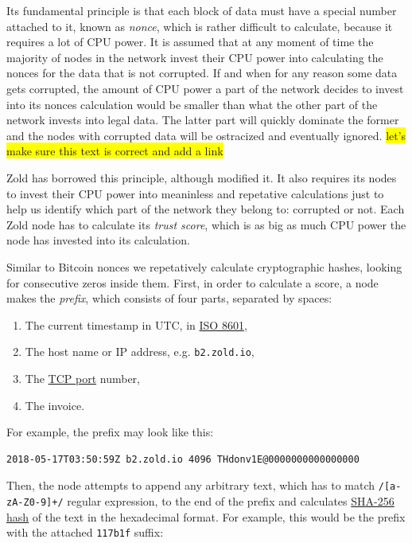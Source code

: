 \documentclass[11pt,oneside]{article}
\newcommand\dd[1]{\colorbox{gray!30}{\texttt{#1}}}
\begin{document}
Its fundamental principle is that each block of data must have a special
number attached to it, known as \emph{nonce}, which is rather difficult to calculate,
because it requires a lot of CPU power. It is assumed that at any moment
of time the majority of nodes in the network invest their CPU power into
calculating the nonces for the data that is not corrupted. If and when for any reason
some data gets corrupted, the amount of CPU power a part of the network
decides to invest into its nonces calculation would be smaller than what
the other part of the network invests into legal data. The latter part
will quickly dominate the former and the nodes with corrupted data will
be ostracized and eventually ignored.
\colorbox{yellow}{let's make sure this text is correct and add a link}

Zold has borrowed this principle, although modified it. It also requires
its nodes to invest their CPU power into meaninless and repetative
calculations just to help us identify which part of the network they belong to:
corrupted or not. Each Zold node has to calculate its \emph{trust score},
which is as big as much CPU power the node has invested into its calculation.

Similar to Bitcoin nonces we repetatively calculate cryptographic hashes,
looking for consecutive zeros inside them. First, in order to calculate a score,
a node makes the \emph{prefix}, which consists of four parts,
separated by spaces:

\begin{enumerate}
\item The current timestamp in UTC, in \href{https://en.wikipedia.org/wiki/ISO_8601}{ISO 8601},
\item The host name or IP address, e.g. \dd{b2.zold.io},
\item The \href{https://en.wikipedia.org/wiki/Port_(computer_networking)}{TCP port} number,
\item The invoice.
\end{enumerate}

For example, the prefix may look like this:

\begin{verbatim}
2018-05-17T03:50:59Z b2.zold.io 4096 THdonv1E@0000000000000000
\end{verbatim}

Then, the node attempts to append any arbitrary text, which has to match
\dd{/[a-zA-Z0-9]+/} regular expression, to the end of the prefix and calculates
\href{https://en.wikipedia.org/wiki/SHA-2}{SHA-256 hash}
of the text in the hexadecimal format. For example, this would be the prefix
with the attached \dd{117b1f} suffix:
\end{document}
